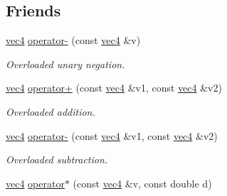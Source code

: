 \subsection*{\-Friends}
\begin{DoxyCompactItemize}
\item 
\hypertarget{classutil_1_1math_1_1vec4_ad251adce26c15c60b47175794dcee239}{\hyperlink{classutil_1_1math_1_1vec4}{vec4} \hyperlink{classutil_1_1math_1_1vec4_ad251adce26c15c60b47175794dcee239}{operator-\/} (const \hyperlink{classutil_1_1math_1_1vec4}{vec4} \&v)}\label{classutil_1_1math_1_1vec4_ad251adce26c15c60b47175794dcee239}

\begin{DoxyCompactList}\small\item\em \-Overloaded unary negation. \end{DoxyCompactList}\item 
\hypertarget{classutil_1_1math_1_1vec4_a14305711bf036911c78712f4bbc609f9}{\hyperlink{classutil_1_1math_1_1vec4}{vec4} \hyperlink{classutil_1_1math_1_1vec4_a14305711bf036911c78712f4bbc609f9}{operator+} (const \hyperlink{classutil_1_1math_1_1vec4}{vec4} \&v1, const \hyperlink{classutil_1_1math_1_1vec4}{vec4} \&v2)}\label{classutil_1_1math_1_1vec4_a14305711bf036911c78712f4bbc609f9}

\begin{DoxyCompactList}\small\item\em \-Overloaded addition. \end{DoxyCompactList}\item 
\hypertarget{classutil_1_1math_1_1vec4_a8ac6ad58f27cb2dcb27b3b32f7d5a808}{\hyperlink{classutil_1_1math_1_1vec4}{vec4} \hyperlink{classutil_1_1math_1_1vec4_a8ac6ad58f27cb2dcb27b3b32f7d5a808}{operator-\/} (const \hyperlink{classutil_1_1math_1_1vec4}{vec4} \&v1, const \hyperlink{classutil_1_1math_1_1vec4}{vec4} \&v2)}\label{classutil_1_1math_1_1vec4_a8ac6ad58f27cb2dcb27b3b32f7d5a808}

\begin{DoxyCompactList}\small\item\em \-Overloaded subtraction. \end{DoxyCompactList}\item 
\hypertarget{classutil_1_1math_1_1vec4_ab4381aa9f0f164f8b724a87e259430d9}{\hyperlink{classutil_1_1math_1_1vec4}{vec4} \hyperlink{classutil_1_1math_1_1vec4_ab4381aa9f0f164f8b724a87e259430d9}{operator$\ast$} (const \hyperlink{classutil_1_1math_1_1vec4}{vec4} \&v, const double d)}\label{classutil_1_1math_1_1vec4_ab4381aa9f0f164f8b724a87e259430d9}


\end{DoxyCompactItemize}
